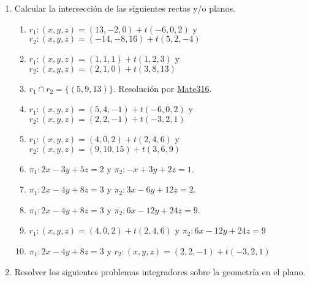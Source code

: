 \documentclass[a4paper]{article}
\newcommand{\answer}{\item[**]}
\newcommand{\exercise}{\item}
\begin{document}
\begin{enumerate}
\begin{enumerate} [label=(\alph*)]
		\item  Contiene a la recta $r: (x,y,z)=(5,1,0)+t(1,-3,1)$.

		\item Es perpendicular a los planos $\pi_1: 2x-3y+5z=2$ y $\pi_2: -x+3y+2z=1$ e incluye al punto $P(5,1,0)$.

		\item Es perpendicular al planos $\pi: 3x-2y+z=5$ y pasa por $P(4,1,5)$.

		\item  Contiene a la recta $r: (x,y,z)=(2,1,2)+t(0,4,1)$ y al punto $P(1,2,3)$

		\item  Contiene a las rectas $r_1: (x,y,z)=(13,-2,0)+t(-6,0,2)$ y $r_2: (x,y,z)=(-14,-8,16)+t(5,2,-4)$.

	\end{enumerate}

	\exercise Calcular la intersección de las siguientes rectas y/o planos.
	\begin{enumerate} [label=(\alph*)]

		\item $r_1: (x,y,z)=(13,-2,0)+t(-6,0,2)$ y $r_2: (x,y,z)=(-14,-8,16)+t(5,2,-4)$

		\item $r_1: (x,y,z)=(1,1,1)+t(1,2,3)$ y $r_2: (x,y,z)=(2,1,0)+t(3,8,13)$
		\answer $r_1 \cap r_2 = \{(5,9,13)\}$. Resolución por \href{https://youtu.be/KebOzsUUmq4?t=2304}{Mate316}.

		\item $r_1: (x,y,z)=(5,4,-1)+t(-6,0,2)$ y $r_2: (x,y,z)=(2,2,-1)+t(-3,2,1)$
		\item $r_1: (x,y,z)=(4,0,2)+t(2,4,6)$ y $r_2: (x,y,z)=(9,10,15)+t(3,6,9)$
		\item $\pi_1: 2x-3y+5z=2$ y $\pi_2: -x+3y+2z=1$.
		\item $\pi_1: 2x-4y+8z=3$ y $\pi_2: 3x-6y+12z=2$.
		\item $\pi_1: 2x-4y+8z=3$ y $\pi_2: 6x-12y+24z=9$.
		\item $r_1: (x,y,z)=(4,0,2)+t(2,4,6)$ y $\pi_2: 6x-12y+24z=9$
		\item $\pi_1: 2x-4y+8z=3$ y $r_2: (x,y,z)=(2,2,-1)+t(-3,2,1)$

	\end{enumerate}

	\exercise Resolver los siguientes problemas integradores sobre la geometría en el plano.
	\begin{enumerate} [label=(\alph*)]
		

\end{enumerate}
\end{enumerate}
\end{document}
